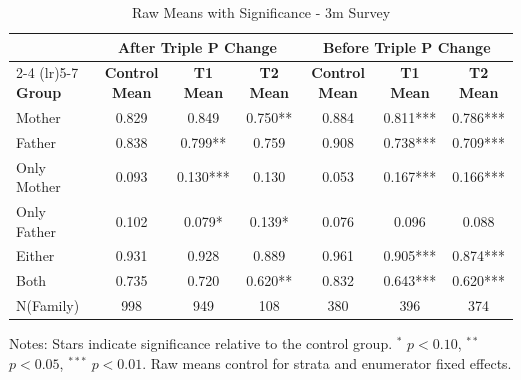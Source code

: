 \begin{table}[htbp]
\centering
\begin{threeparttable}
\caption{Raw Means with Significance  - 3m Survey}
\begin{tabular}{lcccccc}
\toprule
& \multicolumn{3}{c}{After Triple P Change} & \multicolumn{3}{c}{Before Triple P Change} \\
\cmidrule(lr){2-4} \cmidrule(lr){5-7}
\textbf{Group} & \textbf{Control Mean} & \textbf{T1 Mean} & \textbf{T2 Mean} & \textbf{Control Mean} & \textbf{T1 Mean} & \textbf{T2 Mean} \\
\midrule
Mother &  0.829 &  0.849 &  0.750** &  0.884 &  0.811*** &  0.786*** \\
Father &  0.838 &  0.799** &  0.759 &  0.908 &  0.738*** &  0.709*** \\
Only Mother &  0.093 &  0.130*** &  0.130 &   0.053 &  0.167*** &  0.166***  \\
Only Father &  0.102 &  0.079* &  0.139* &   0.076 &  0.096 &  0.088  \\
Either &  0.931 &  0.928 &  0.889 &  0.961 &  0.905*** &  0.874*** \\
Both &  0.735 &  0.720 &  0.620** &  0.832 &  0.643*** &  0.620***  \\
N(Family) & 998 & 949 & 108  & 380 & 396 & 374 \\
\bottomrule
\end{tabular}
\begin{tablenotes}
\small
Notes: Stars indicate significance relative to the control group. 
$^{*}$ $p<0.10$, $^{**}$ $p<0.05$, $^{***}$ $p<0.01$.
Raw means control for strata and enumerator fixed effects.
\end{tablenotes}
\end{threeparttable}
\end{table}

